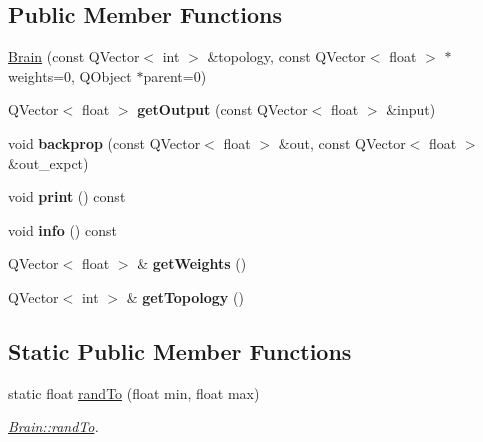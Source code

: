 \subsection*{Public Member Functions}
\begin{DoxyCompactItemize}
\item 
\hyperlink{classBrain_ad9637628ba623b059846b435fc11348f}{Brain} (const Q\+Vector$<$ int $>$ \&topology, const Q\+Vector$<$ float $>$ $\ast$weights=0, Q\+Object $\ast$parent=0)
\item 
\mbox{\label{classBrain_ab93fdda1e6862ee9c39b443c626747c4}} 
Q\+Vector$<$ float $>$ {\bfseries get\+Output} (const Q\+Vector$<$ float $>$ \&input)
\item 
\mbox{\label{classBrain_aaedc1a6837b5da9e107dd32e4758866c}} 
void {\bfseries backprop} (const Q\+Vector$<$ float $>$ \&out, const Q\+Vector$<$ float $>$ \&out\+\_\+expct)
\item 
\mbox{\label{classBrain_aad7d0a00e9bee1d550a42353ef362327}} 
void {\bfseries print} () const
\item 
\mbox{\label{classBrain_afbd471807a2991713cf498d9f8727ac4}} 
void {\bfseries info} () const
\item 
\mbox{\label{classBrain_af170533115f7495684eeb5926fbcc8cd}} 
Q\+Vector$<$ float $>$ \& {\bfseries get\+Weights} ()
\item 
\mbox{\label{classBrain_a60c602a02b896c888ceeb357594b9d1e}} 
Q\+Vector$<$ int $>$ \& {\bfseries get\+Topology} ()
\end{DoxyCompactItemize}
\subsection*{Static Public Member Functions}
\begin{DoxyCompactItemize}
\item 
static float \hyperlink{classBrain_acb60a16fa86243d358bb64bfaeee91d0}{rand\+To} (float min, float max)
\begin{DoxyCompactList}\small\item\em \hyperlink{classBrain_acb60a16fa86243d358bb64bfaeee91d0}{Brain\+::rand\+To}. \end{DoxyCompactList}\end{DoxyCompactItemize}
